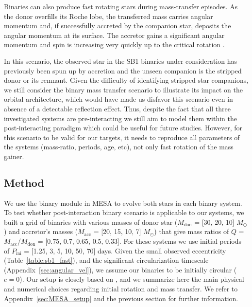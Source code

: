 \documentclass{aa}
\DeclareRobustCommand{\Tabref}[1]{Table~\ref{#1}}
\DeclareRobustCommand{\Appref}[1]{Appendix~\ref{#1}}
\begin{document}
Binaries can also produce fast rotating stars during mass-transfer episodes. As
the donor overfills its Roche lobe, the transferred mass carries
angular momentum and, if successfully accreted by the companion star,
deposits the angular momentum at its surface.
The accretor gains a significant angular momentum and spin is
increasing very quickly up to the critical rotation \citep{packet:81, Langer_2003, Renzo_2021}.

 In this scenario, the observed star in the SB1 binaries under consideration has previously been spun up by accretion and the
  unseen companion is the stripped donor \citep[e.g.,][]{Gotberg_2023, Drout_2023} or its remnant.
Given the difficulty of identifying stripped star companions, we still consider the binary mass transfer scenario to illustrate its impact on the orbital architecture, which would have made us disfavor this scenario even in absence of a detectable reflection effect.
Thus, despite the fact that all three investigated systems are pre-interacting we still aim to model them within the post-interacting paradigm which could be useful for future studies.
However, for this scenario to be valid for our targets, it needs to reproduce
all parameters of the systems (mass-ratio, periods, age, etc), not only fast rotation of the mass gainer.

\subsection{Method}

We use the binary module in MESA to evolve both stars in each binary system. To test whether post-interaction binary scenario is applicable to our systems, we
built a grid of binaries with various masses of donor star ($M_\mathrm{don}$ = [30, 20, 10] $M_{\odot}$) and accretor's masses ($M_\mathrm{acc}$ = [20, 15, 10, 7] $M_{\odot}$) that give mass ratios of $Q$ =
$M_\mathrm{acc}$/$M_\mathrm{don}$ = [0.75, 0.7, 0.65, 0.5, 0.33]. %
For these systems we use initial periods of $P_\mathrm{ini}$ = [1.25, 3, 5, 10, 50, 70] days. Given the small observed
  eccentricity (\Tabref{table:sb1_fast}), and the significant circularization timescale (\Appref{sec:angular_vel}), we assume our binaries
  to be initially circular ($e=0$). Our setup is closely based
  on \cite{Renzo_2021, renzo:23}, and we summarize here the main
  physical and numerical choices regarding initial rotation and mass transfer.
  We refer to \Appref{sec:MESA_setup} and the previous section for
  further information.
\end{document}
